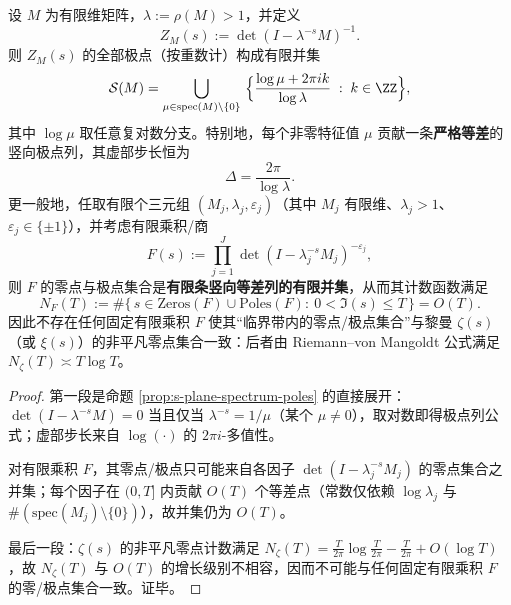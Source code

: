 \begin{proposition}[有限维行列式的竖向晶格障碍]\label{prop:finite-kernel-lattice-obstruction}
设 \(M\) 为有限维矩阵，\(\lambda:=\rho(M)>1\)，并定义
\[
Z_M(s):=\det(I-\lambda^{-s}M)^{-1}.
\]
则 \(Z_M(s)\) 的全部极点（按重数计）构成有限并集
\[
\mathcal{S}(M)=\bigcup_{\mu\in\mathrm{spec}(M)\setminus\{0\}}\ \Bigl\{\frac{\log\mu+2\pi i k}{\log\lambda}\;:\;k\in\ZZ\Bigr\},
\]
其中 \(\log\mu\) 取任意复对数分支。特别地，每个非零特征值 \(\mu\) 贡献一条\textbf{严格等差}的竖向极点列，其虚部步长恒为
\[
\Delta=\frac{2\pi}{\log\lambda}.
\]
更一般地，任取有限个三元组 \((M_j,\lambda_j,\varepsilon_j)\)（其中 \(M_j\) 有限维、\(\lambda_j>1\)、\(\varepsilon_j\in\{\pm 1\}\)），并考虑有限乘积/商
\[
F(s):=\prod_{j=1}^{J}\det(I-\lambda_j^{-s}M_j)^{-\varepsilon_j},
\]
则 \(F\) 的零点与极点集合是\textbf{有限条竖向等差列的有限并集}，从而其计数函数满足
\[
N_F(T):=\#\{\,s\in\mathrm{Zeros}(F)\cup\mathrm{Poles}(F):\ 0<\Im(s)\le T\,\}=O(T).
\]
因此不存在任何固定有限乘积 \(F\) 使其“临界带内的零点/极点集合”与黎曼 \(\zeta(s)\)（或 \(\xi(s)\)）的非平凡零点集合一致：后者由 Riemann--von Mangoldt 公式满足 \(N_\zeta(T)\asymp T\log T\)。
\end{proposition}
\begin{proof}
第一段是命题 \ref{prop:s-plane-spectrum-poles} 的直接展开：\(\det(I-\lambda^{-s}M)=0\) 当且仅当 \(\lambda^{-s}=1/\mu\)（某个 \(\mu\neq 0\)），取对数即得极点列公式；虚部步长来自 \(\log(\cdot)\) 的 \(2\pi i\)-多值性。
\par
对有限乘积 \(F\)，其零点/极点只可能来自各因子 \(\det(I-\lambda_j^{-s}M_j)\) 的零点集合之并集；每个因子在 \((0,T]\) 内贡献 \(O(T)\) 个等差点（常数仅依赖 \(\log\lambda_j\) 与 \(\#(\mathrm{spec}(M_j)\setminus\{0\})\)），故并集仍为 \(O(T)\)。
\par
最后一段：\(\zeta(s)\) 的非平凡零点计数满足 \(N_\zeta(T)=\frac{T}{2\pi}\log\frac{T}{2\pi}-\frac{T}{2\pi}+O(\log T)\)，故 \(N_\zeta(T)\) 与 \(O(T)\) 的增长级别不相容，因而不可能与任何固定有限乘积 \(F\) 的零/极点集合一致。证毕。
\end{proof}

